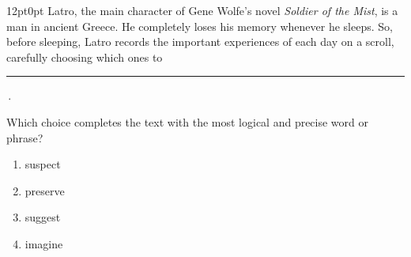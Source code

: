 \documentclass[11pt, twocolumn]{article}
\newcounter{questionnum}
\begin{document}
\vspace{6pt}\noindent
\begin{minipage}{\columnwidth}\raggedright
\noindent{}\par\vspace{8pt}
\begin{adjustwidth}{12pt}{0pt}
Latro, the main character of Gene Wolfe's novel \textit{Soldier of the Mist}, is a man in ancient Greece. He completely loses his memory whenever he sleeps. So, before sleeping, Latro records the important experiences of each day on a scroll, carefully choosing which ones to \,\rule{2cm}{0.4pt}\,.
\vspace{6pt}

Which choice completes the text with the most logical and precise word or phrase?
\begin{enumerate}[label=\Alph*),leftmargin=18pt,topsep=3pt,itemsep=2pt]
  \item suspect
  \item preserve
  \item suggest
  \item imagine
\end{enumerate}
\end{adjustwidth}
\end{minipage}\par
\end{document}
